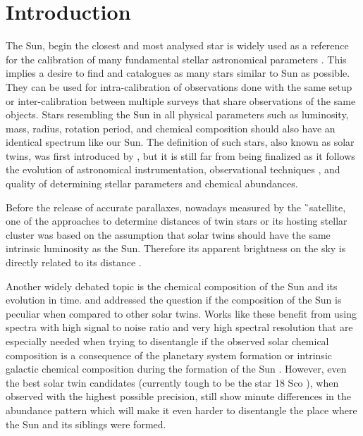 \section{Introduction}
\label{sec:intro_solar}
The Sun, begin the closest and most analysed star is widely used as a reference for the calibration of many fundamental stellar astronomical parameters \cite{2010A&A...522A..98M, 2012MNRAS.426..484D}. This implies a desire to find and catalogues as many stars similar to Sun as possible. They can be used for intra-calibration of observations done with the same setup or inter-calibration between multiple surveys that share observations of the same objects. Stars resembling the Sun in all physical parameters such as luminosity, mass, radius, rotation period, and chemical composition should also have an identical spectrum like our Sun. The definition of such stars, also known as solar twins, was first introduced by \citet{1981A&A....94....1C}, but it is still far from being finalized as it follows the evolution of astronomical instrumentation, observational techniques \cite{2017AN....338..442A}, and quality of determining stellar parameters and chemical abundances.

Before the release of accurate parallaxes, nowadays measured by the \G\ satellite, one of the approaches to determine distances of twin stars or its hosting stellar cluster was based on the assumption that solar twins should have the same intrinsic luminosity as the Sun. Therefore its apparent brightness on the sky is directly related to its distance \cite{2015MNRAS.453.1428J, 2016A&A...595A..59M, 2017MNRAS.472.2517J}.

Another widely debated topic is the chemical composition of the Sun and its evolution in time. \citet{2009A&A...508L..17R} and \citet{2015A&A...579A..52N} addressed the question if the composition of the Sun is peculiar when compared to other solar twins. Works like these benefit from using spectra with high signal to noise ratio and very high spectral resolution that are especially needed when trying to disentangle if the observed solar chemical composition is a consequence of the planetary system formation \cite{2014A&A...572A..48R} or intrinsic galactic chemical composition during the formation of the Sun \cite{2015A&A...579A..52N, 2016A&A...593A..65N, 2020A&A...633L...9J}. However, even the best solar twin candidates (currently tough to be the star 18 Sco \cite{2014ApJ...791...14M}), when observed with the highest possible precision, still show minute differences in the abundance pattern which will make it even harder to disentangle the place where the Sun and its siblings were formed.

